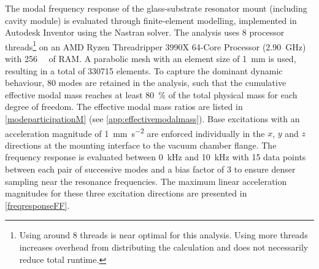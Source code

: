 \documentclass[../Thesis-IJspeert.tex]{subfiles}
\begin{document}
The modal frequency response of the glass-substrate resonator mount (including cavity module) is evaluated through finite-element modelling, implemented in Autodesk Inventor using the Nastran solver. The analysis uses \num{8} processor threads\footnote{Using around \num{8} threads is near optimal for this analysis. Using more threads increases overhead from distributing the calculation and does not necessarily reduce total runtime.} on an AMD Ryzen Threadripper 3990X 64-Core Processor (\SI{2.90}{\giga\hertz}) with \SI{256}{\giga\byte} of RAM. A parabolic mesh with an element size of \SI{1}{\milli\metre} is used, resulting in a total of \num{330715} elements. To capture the dominant dynamic behaviour, \num{80} modes are retained in the analysis, such that the cumulative effective modal mass reaches at least \SI{80}{\percent} of the total physical mass for each degree of freedom. The effective modal mass ratios are listed in \autoref{modeparticipationM} (see \autoref{app:effectivemodalmass}). Base excitations with an acceleration magnitude of \SI{1}{\milli\metre\per\second\squared} are enforced individually in the $x$, $y$ and $z$ directions at the mounting interface to the vacuum chamber flange. The frequency response is evaluated between \SI{0}{\kilo\hertz} and \SI{10}{\kilo\hertz} with \num{15} data points between each pair of successive modes and a bias factor of \num{3} to ensure denser sampling near the resonance frequencies. The maximum linear acceleration magnitudes for these three excitation directions are presented in \autoref{freqresponseFF}.
\end{document}
